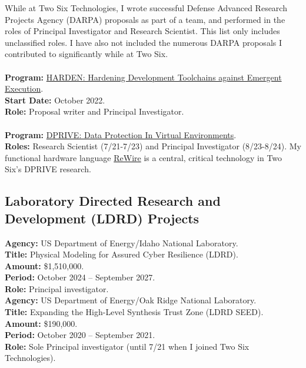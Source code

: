 \documentclass[12pt]{article} %
\begin{document}
While at Two Six Technologies, I wrote successful Defense Advanced Research Projects Agency (DARPA) proposals as part of a team, and performed in the roles of Principal Investigator and Research Scientist. This list only includes unclassified roles. I have also not included the numerous DARPA proposals I contributed to significantly while at Two Six.
\\
\\
{\bf Program:} \href{https://www.darpa.mil/news-events/2021-09-22}{HARDEN: Hardening Development Toolchains against Emergent Execution}.
\\
{\bf Start Date:} October 2022.
\\
{\bf Role:} Proposal writer and Principal Investigator.
\\
\\
{\bf Program:} \href{https://www.darpa.mil/research/programs/data-protection-in-virtual-environments}{DPRIVE: Data Protection In Virtual Environments}.
\\
{\bf Roles:} Research Scientist (7/21-7/23) and Principal Investigator (8/23-8/24). My functional hardware language \href{https://github.com/twosixlabs/ReWire}{ReWire} is a central, critical technology in Two Six's DPRIVE research.

\subsection*{Laboratory Directed Research and Development (LDRD) Projects}

{\bf Agency:} US Department of Energy/Idaho National Laboratory.
\\
{\bf Title:} Physical Modeling for Assured Cyber Resilience (LDRD).
\\
{\bf Amount:} \$1,510,000.
\\
{\bf Period:}   October 2024  --  September 2027.
\\
{\bf Role:}    Principal investigator.
\\

{\bf Agency:} US Department of Energy/Oak Ridge National Laboratory.
\\
{\bf Title:} Expanding the High-Level Synthesis Trust Zone (LDRD SEED).
\\
{\bf Amount:} \$190,000.
\\
{\bf Period:}   October 2020  --  September 2021.
\\
{\bf Role:}    Sole Principal investigator (until 7/21 when I joined Two Six Technologies).
\end{document}
